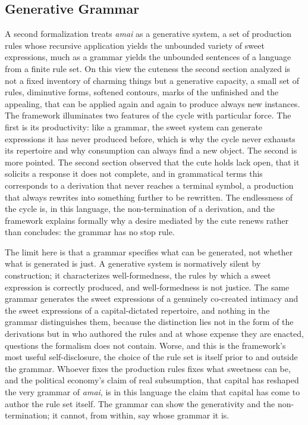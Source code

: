 \documentclass[11pt,a4paper]{article}
\begin{document}
\subsection{Generative Grammar}

A second formalization treats \textit{amai} as a generative system, a set of production rules whose recursive application yields the unbounded variety of sweet expressions, much as a grammar yields the unbounded sentences of a language from a finite rule set. On this view the cuteness the second section analyzed is not a fixed inventory of charming things but a generative capacity, a small set of rules, diminutive forms, softened contours, marks of the unfinished and the appealing, that can be applied again and again to produce always new instances. The framework illuminates two features of the cycle with particular force. The first is its productivity: like a grammar, the sweet system can generate expressions it has never produced before, which is why the cycle never exhausts its repertoire and why consumption can always find a new object. The second is more pointed. The second section observed that the cute holds lack open, that it solicits a response it does not complete, and in grammatical terms this corresponds to a derivation that never reaches a terminal symbol, a production that always rewrites into something further to be rewritten. The endlessness of the cycle is, in this language, the non-termination of a derivation, and the framework explains formally why a desire mediated by the cute renews rather than concludes: the grammar has no stop rule.

The limit here is that a grammar specifies what can be generated, not whether what is generated is just. A generative system is normatively silent by construction; it characterizes well-formedness, the rules by which a sweet expression is correctly produced, and well-formedness is not justice. The same grammar generates the sweet expressions of a genuinely co-created intimacy and the sweet expressions of a capital-dictated repertoire, and nothing in the grammar distinguishes them, because the distinction lies not in the form of the derivations but in who authored the rules and at whose expense they are enacted, questions the formalism does not contain. Worse, and this is the framework's most useful self-disclosure, the choice of the rule set is itself prior to and outside the grammar. Whoever fixes the production rules fixes what sweetness can be, and the political economy's claim of real subsumption, that capital has reshaped the very grammar of \textit{amai}, is in this language the claim that capital has come to author the rule set itself. The grammar can show the generativity and the non-termination; it cannot, from within, say whose grammar it is.
\end{document}
